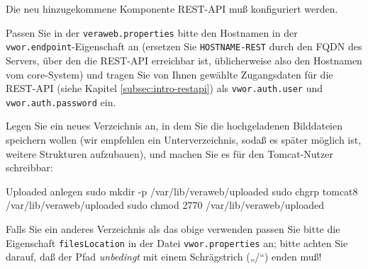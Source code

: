 \documentclass{tarentanleitung}
\newif\ifoa
\begin{document}
Die neu hinzugekommene Komponente REST-API muß konfiguriert werden.

Passen Sie in der \texttt{veraweb.properties} bitte den Hostnamen
in der \texttt{vwor.endpoint}-Eigenschaft an (ersetzen Sie
\texttt{HOSTNAME-REST} durch den FQDN des Servers, über den die
REST-API erreichbar ist, üblicherweise also den Hostnamen vom
core-System) und tragen Sie von Ihnen gewählte Zugangsdaten für
die REST-API (siehe Kapitel \ref{subsec:intro-restapi}) als
\texttt{vwor.auth.user} und \texttt{vwor.auth.password} ein.
\ifoa
Desweiteren ersetzen Sie bitte \texttt{HOSTNAME-OSIAM} und
\texttt{HOSTNAME-OA} an allen Stellen durch die Hostnamen
des OSIAM- bzw. des Online-Anmeldungssystems. Schließlich
tragen Sie für \texttt{osiam.client.secret} denselben Wert
ein, den Sie bei der
  \nameref{subsec:setup-osiam-register}
als \texttt{vwsecret} gesetzt hatten.
\fi%

\begin{minipage}{\linewidth}
Legen Sie ein neues Verzeichnis an, in dem Sie die hochgeladenen
Bilddateien speichern wollen (wir empfehlen ein Unterverzeichnis,
sodaß es später möglich ist, weitere Strukturen aufzubauen), und
machen Sie es für den Tomcat-Nutzer schreibbar:

\begin{lstdump}{Uploaded anlegen}
sudo mkdir -p /var/lib/veraweb/uploaded
sudo chgrp tomcat8 /var/lib/veraweb/uploaded
sudo chmod 2770 /var/lib/veraweb/uploaded
\end{lstdump}

Falls Sie ein anderes Verzeichnis als das obige verwenden passen
Sie bitte die Eigenschaft \texttt{filesLocation} in der Datei
\texttt{vwor.properties} an; bitte achten Sie darauf, daß der
Pfad \emph{unbedingt} mit einem Schrägstrich („/“) enden muß!
\end{minipage}
\end{document}
